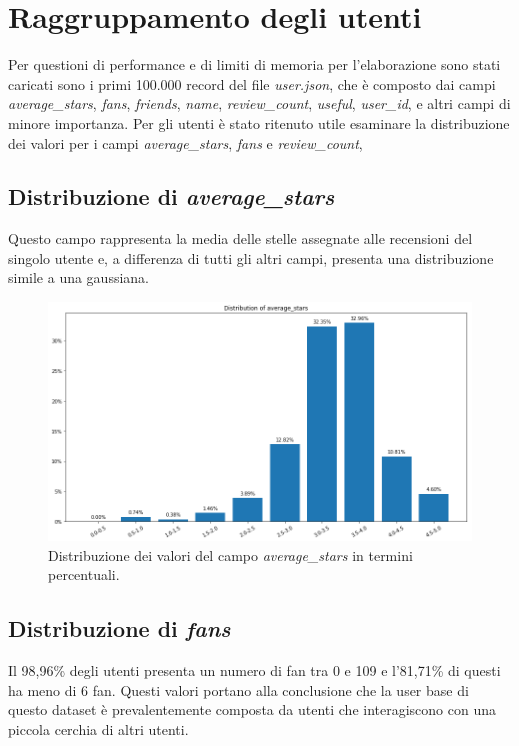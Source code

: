 \documentclass[12pt]{article}
\begin{document}
\section{Raggruppamento degli utenti}
\label{sec:users}
Per questioni di performance e di limiti di memoria per l'elaborazione sono stati caricati sono i primi 100.000 record del file \textit{user.json}, che è composto dai campi \textit{average\_stars}, \textit{fans}, \textit{friends}, \textit{name}, \textit{review\_count}, \textit{useful}, \textit{user\_id}, e altri campi di minore importanza. \newline
Per gli utenti è stato ritenuto utile esaminare la distribuzione dei valori per i campi \textit{average\_stars}, \textit{fans} e \textit{review\_count},

\subsection{Distribuzione di \textit{average\_stars}}
Questo campo rappresenta la media delle stelle assegnate alle recensioni del singolo utente e, a differenza di tutti gli altri campi, presenta una distribuzione simile a una gaussiana.
\begin{figure}[H]
\centering
\includegraphics[width=\textwidth]{images/average_stars_distribution.png}
\caption{Distribuzione dei valori del campo \textit{average\_stars} in termini percentuali.}
\end{figure}

\subsection{Distribuzione di \textit{fans}}
Il 98,96\% degli utenti presenta un numero di fan tra 0 e 109 e l'81,71\% di questi ha meno di 6 fan. Questi valori portano alla conclusione che la user base di questo dataset è prevalentemente composta da utenti che interagiscono con una piccola cerchia di altri utenti.
\end{document}
